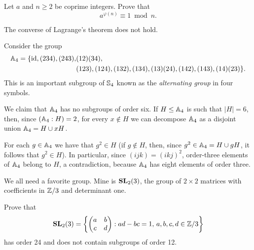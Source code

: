 \begin{exercise}
        Let $a$ and $n\geq2$ be coprime integers. Prove that 
        \[
        a^{\varphi(n)}\equiv1\bmod n.
        \]
\end{exercise}

The converse of Lagrange's theorem does not hold.   

\begin{example}
\label{exa:A4}
Consider the group 
    \begin{align*}
\mathbb{A}_4=\{\operatorname{id},(234),(243),&(12)(34),\\&(123),(124),(132),(134),(13)(24),(142),(143),(14)(23)\}.
\end{align*}
This is an important subgroup of $\mathbb{S}_4$ known as the 
\emph{alternating group} in four symbols. 

We claim that $\mathbb{A}_4$ has no subgroups of order six. If $H\leq\mathbb{A}_4$ is such that 
$|H|=6$, then, since $(\mathbb{A}_4:H)=2$, for every $x\not\in H$ we can decompose $\mathbb{A}_4$ as 
a disjoint union 
$\mathbb{A}_4=H\cup xH$.

For each $g\in\mathbb{A}_4$ we have that $g^2\in H$ (if $g\not\in H$, then, since $g^2\in\mathbb{A}_4=H\cup
gH$, it follows that $g^2\in H$). In particular, since 
$(ijk)=(ikj)^2$, order-three elements of $\mathbb{A}_4$ belong to $H$, a contradiction, 
because $\mathbb{A}_4$ has eight elements of order three. 
\end{example}

We all need a favorite group. Mine is $\mathbf{SL}_2(3)$,
the group of $2\times2$ matrices with coefficients in $\mathbb{Z}/3$
and determinant one. 

\begin{bonus}
\label{bonus:SL23}
Prove that    \[
    \mathbf{SL}_2(3)=\left\{\begin{pmatrix}a&b\\c&d\end{pmatrix}:ad-bc=1,\,a,b,c,d\in\mathbb{Z}/3\right\}
    \]
    has order 24 and does not contain subgroups of order 12.
\end{bonus}

